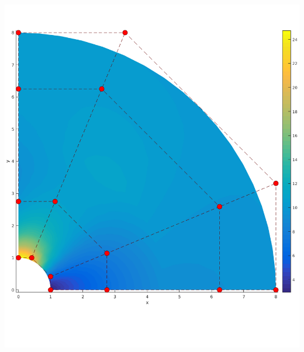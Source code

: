\documentclass{beamer}
\begin{document}
\begin{frame}
\begin{minipage}{0.49\textwidth}
		\includegraphics[scale=0.24]{pics/plateWithAHole/plate_controlnet_1.png}
	\end{minipage}
\end{frame}
\end{document}
